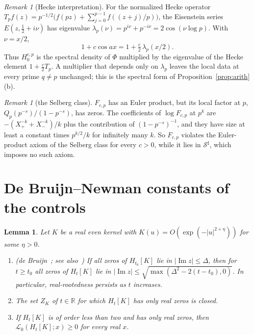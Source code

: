 \documentclass[11pt]{article}
\numberwithin{equation}{section}
\newtheorem{lemma}[theorem]{Lemma}
\theoremstyle{definition}
\theoremstyle{remark}
\newtheorem{remark}[theorem]{Remark}
\DeclareMathOperator{\Ima}{Im}
\newcommand{\Lag}{\mathscr L_0}
\newcommand{\Sh}{\mathcal S^\sharp}
\begin{document}
\begin{remark}[Hecke interpretation]\label{rem:hecke}
For the normalized Hecke operator
$T_pf(z)=p^{-1/2}\bigl(f(pz)+\sum_{j=0}^{p-1}f((z+j)/p)\bigr)$, the
Eisenstein series $E(z,\tfrac12+i\nu)$ has eigenvalue
$\lambda_p(\nu)=p^{i\nu}+p^{-i\nu}=2\cos(\nu\log p)$. With $\nu=x/2$,
\[
1+c\cos ax=1+\tfrac c2\,\lambda_p(x/2).
\]
Thus $H^{c,p}_0$ is the spectral density of $\Phi$ multiplied by the
eigenvalue of the Hecke element $1+\tfrac c2T_p$. A multiplier that depends
only on $\lambda_p$ leaves the local data at every prime $q\ne p$ unchanged;
this is the spectral form of Proposition~\ref{prop:arith}(b).
\end{remark}

\begin{remark}[the Selberg class]\label{rem:selberg}
$F_{c,p}$ has an Euler product, but its local factor at $p$,
$Q_p(p^{-s})/(1-p^{-s})$, has zeros. The coefficients of $\log F_{c,p}$ at
$p^k$ are $-(X_+^{-k}+X_-^{-k})/k$ plus the contribution of
$(1-p^{-s})^{-1}$, and they have size at least a constant times $p^{k/2}/k$
for infinitely many $k$. So $F_{c,p}$ violates the Euler-product axiom of the
Selberg class for every $c>0$, while it lies in $\Sh$, which imposes no such
axiom.
\end{remark}

\section{De Bruijn--Newman constants of the controls}\label{sec:Lambda}

\begin{lemma}\label{lem:dbn}
Let $K$ be a real even kernel with $K(u)=O(\exp(-|u|^{2+\eta}))$ for some
$\eta>0$.
\begin{enumerate}[label=\textup{(\alph*)}]
\item \textup{(de Bruijn~\cite[Theorem~13]{debruijn}; see
also~\cite[Theorem~3.2]{polymath})} If all zeros of $H_{t_0}[K]$ lie in
$|\Ima z|\le\Delta$, then for $t\ge t_0$ all zeros of $H_t[K]$ lie in
$|\Ima z|\le\sqrt{\max(\Delta^2-2(t-t_0),0)}$. In particular, real-rootedness
persists as $t$ increases.
\item The set $Z_K$ of $t\in\mathbb R$ for which $H_t[K]$ has only real zeros
is closed.
\item If $H_t[K]$ is of order less than two and has only real zeros, then
$\Lag(H_t[K];x)\ge0$ for every real $x$.
\end{enumerate}
\end{lemma}
\end{document}
